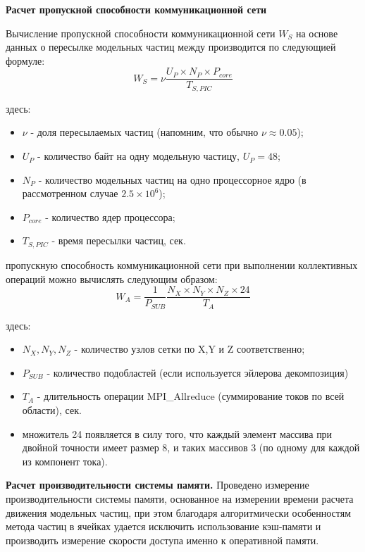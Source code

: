 \textbf{Расчет пропускной способности коммуникационной сети}

Вычисление пропускной способности коммуникационной сети $W_S$ на основе данных о пересылке модельных частиц между  производится по следующией формуле:
\begin{equation}
W_S =  \nu \frac{U_P\times N_P \times P_{core}}{T_{S,PIC}}
\label{Net_performance_peer}
\end{equation}


здесь:
\begin{itemize}
	\item $\nu$ - доля пересылаемых частиц (напомним, что обычно $\nu \approx 0.05$);
	\item $U_P$ - количество байт на одну модельную частицу, $U_P = 48$;
	\item $N_P$ - количество модельных частиц на одно процессорное ядро (в рассмотренном случае $2.5\times 10^6$);  
	\item $P_{core}$ - количество ядер процессора;
	\item $T_{S,PIC}$  - время пересылки частиц, сек.
\end{itemize}	

пропускную способность коммуникационной сети при выполнении коллективных операций можно вычислять следующим образом:
\begin{equation}
W_A = \frac{1}{P_{SUB}}\frac{N_X\times N_Y \times N_Z \times 24}{T_A}
\label{Net_performance_collective}
\end{equation}

здесь:
\begin{itemize}
	\item $N_X, N_Y, N_Z$ - количество узлов сетки по X,Y и Z соответственно;
	\item $P_{SUB}$ - количество подобластей (если используется эйлерова декомпозиция)
	\item $T_{A}$ - длительность операции MPI\_Allreduce (суммирование токов по всей области), сек.
	\item множитель 24 появляется в силу того, что каждый элемент массива при двойной точности имеет размер 8, и таких массивов 3 (по одному для каждой из компонент тока).
\end{itemize}	


\textbf{Расчет производительности системы памяти.}
Проведено измерение производительности системы памяти, основанное на измерении времени расчета движения модельных частиц, при этом благодаря алгоритмически особенностям метода частиц в ячейках удается исключить использование кэш-памяти и производить измерение скорости доступа именно к оперативной памяти.

